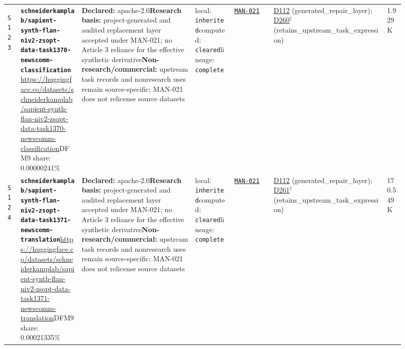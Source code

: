 \documentclass[9pt,a4paper]{article}
\newcommand{\srcid}[1]{\hypertarget{src:#1}{\texttt{#1}}}
\begin{document}
\begin{landscape}
\begin{longtable}{@{}L{0.03\linewidth}L{0.14\linewidth}L{0.26\linewidth}L{0.09\linewidth}L{0.09\linewidth}L{0.265\linewidth}L{0.045\linewidth}@{}}
\srcid{S123} & \textbf{\nolinkurl{schneiderkamplab/sapient-synth-flan-niv2-zsopt-data-task1370-newscomm-classification}}\newline \url{https://huggingface.co/datasets/schneiderkamplab/sapient-synth-flan-niv2-zsopt-data-task1370-newscomm-classification}\newline DFM9 share: 0.00000241\% & \textbf{Declared:} apache-2.0\newline \textbf{Research basis:} project-generated and audited replacement layer accepted under MAN-021; no Article 3 reliance for the effective synthetic derivative\newline \textbf{Non-research/commercial:} upstream task records and nonresearch uses remain source-specific; MAN-021 does not relicense source datasets & local: \texttt{inherited}\newline computed: \texttt{cleared}\newline lineage: \texttt{complete} & \hyperlink{manual:MAN-021}{\texttt{MAN-021}} & \hyperlink{dep:D112}{D112} (generated\_repair\_layer); \hyperlink{dep:D260}{D260}$^{\dagger}$ (retains\_upstream\_task\_expression) & 1.929K \\
\srcid{S124} & \textbf{\nolinkurl{schneiderkamplab/sapient-synth-flan-niv2-zsopt-data-task1371-newscomm-translation}}\newline \url{https://huggingface.co/datasets/schneiderkamplab/sapient-synth-flan-niv2-zsopt-data-task1371-newscomm-translation}\newline DFM9 share: 0.00021335\% & \textbf{Declared:} apache-2.0\newline \textbf{Research basis:} project-generated and audited replacement layer accepted under MAN-021; no Article 3 reliance for the effective synthetic derivative\newline \textbf{Non-research/commercial:} upstream task records and nonresearch uses remain source-specific; MAN-021 does not relicense source datasets & local: \texttt{inherited}\newline computed: \texttt{cleared}\newline lineage: \texttt{complete} & \hyperlink{manual:MAN-021}{\texttt{MAN-021}} & \hyperlink{dep:D112}{D112} (generated\_repair\_layer); \hyperlink{dep:D261}{D261}$^{\dagger}$ (retains\_upstream\_task\_expression) & 170.549K \\

\end{longtable}
\end{landscape}
\end{document}

